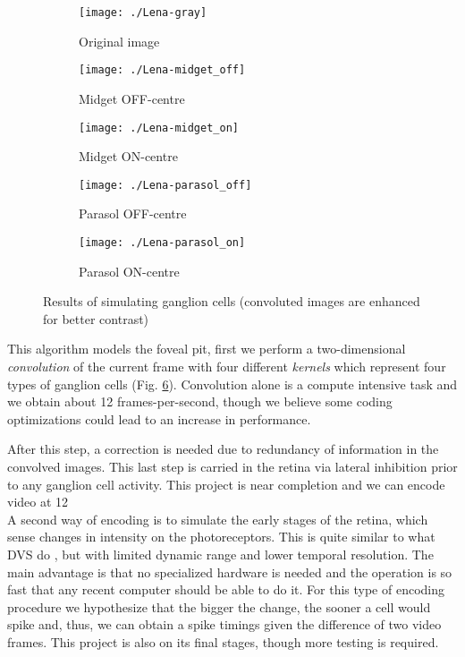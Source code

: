 \begin{figure}[hbt]
  \centering
  \begin{subfigure}[t]{0.15\textwidth}
    \centering
    \captionsetup{justification=centering,margin=0.1cm}
    \texttt{[image: ./Lena-gray]}
    \caption{Original image}
    \label{pic-lena}
  \end{subfigure}
  \begin{subfigure}[t]{0.15\textwidth}
    \centering
    \captionsetup{justification=centering,margin=0.1cm}
    \texttt{[image: ./Lena-midget\_off]}
    \caption{Midget OFF-centre}
    \label{pic-lena-M-OFF}
  \end{subfigure}
  \begin{subfigure}[t]{0.15\textwidth}
    \centering
    \captionsetup{justification=centering,margin=0.1cm}
    \texttt{[image: ./Lena-midget\_on]}
    \caption{Midget ON-centre}
    \label{pic-lena-M-ON}
  \end{subfigure}
  \begin{subfigure}[t]{0.15\textwidth}
    \centering
    \captionsetup{justification=centering,margin=0.1cm}
    \texttt{[image: ./Lena-parasol\_off]}
    \caption{Parasol OFF-centre}
    \label{pic-lena-P-OFF}
  \end{subfigure}
  \begin{subfigure}[t]{0.15\textwidth}
    \centering
    \captionsetup{justification=centering,margin=0.1cm}
    \texttt{[image: ./Lena-parasol\_on]}
    \caption{Parasol ON-centre}
    \label{pic-lena-P-ON}
  \end{subfigure}
  \caption{Results of simulating ganglion cells (convoluted images are enhanced for better contrast)}
  \label{fig-convolution-results}
\end{figure}
This algorithm models the foveal pit, first we perform a two-dimensional  
\emph{convolution} of the current frame with four different \emph{kernels}
which represent four types of ganglion cells (Fig. 
\ref{fig-convolution-results}). Convolution alone is a compute intensive task 
and we obtain about 12 frames-per-second, though we believe some coding 
optimizations could lead to an increase in performance.

After this step, a correction is 
needed due to redundancy of information in the convolved images. This last step
is carried in the retina via lateral inhibition prior to any ganglion cell 
activity. This project is near completion and we can encode video at 12 
\\

A second way of encoding is to simulate the early stages of the retina, which
sense changes in intensity on the photoreceptors. This is quite similar to what 
DVS do \cite{aer-retina-bernabe, dvs-zurich}, but with limited dynamic range 
and lower temporal resolution. The main advantage is that no specialized 
hardware is needed and the operation is so fast that any recent computer should
be able to do it. For this type of encoding procedure we hypothesize that
the bigger the change, the sooner a cell would spike and, thus, we can obtain
a spike timings given the difference of two video frames. This project is also
on its final stages, though more testing is required.

